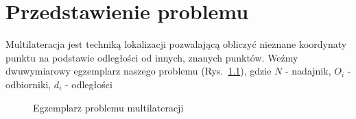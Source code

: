 \chapter{Przedstawienie problemu}

Multilateracja jest techniką lokalizacji pozwalającą obliczyć nieznane koordynaty punktu na podstawie odległości od innych, znanych punktów. Weźmy dwuwymiarowy egzemplarz naszego problemu (Rys.~\ref{fig:example}), gdzie $N$ - nadajnik, $O_i$ - odbiorniki, $d_i$ - odległości

\begin{figure}[!h]
    \centering
    \caption{Egzemplarz problemu multilateracji}
\label{fig:example}
\end{figure}

